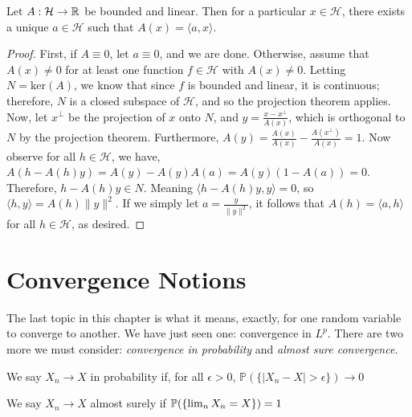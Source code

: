     \begin{theorem}
        Let $A : \mathcal H \to \mathbb R$ be bounded and linear. Then for a particular 
        $x \in \mathcal H$, there exists a unique $a \in \mathcal H$ such that $A(x) = \langle a, x \rangle$. 
    \end{theorem}
    \begin{proof}
        First, if $A \equiv 0$, let $a \equiv 0$, and we are done. Otherwise, assume that 
        $A(x) \neq 0$ for at least one function $f \in \mathcal H$ with $A(x) \neq 0$. Letting 
        $N = \text{ker}(A)$, we know that since $f$ is bounded and linear, it is continuous; therefore, 
        $N$ is a closed subspace of $\mathcal H$, and so the projection theorem applies. Now, let 
        $x^\perp$ be the projection of $x$ onto $N$, and 
        $y = \frac{x-x^\perp}{A(x)}$, which is orthogonal to $N$ by the projection theorem.
        Furthermore, $A(y) = \frac{A(x)}{A(x)} - \frac{A(x^\perp)}{A(x)} = 1$.
        Now observe for all $h \in \mathcal H$, we have, $A(h - A(h)y) = A(y) - A(y)A(a) = A(y)(1 - A(a)) = 0$.
        Therefore, $h-A(h)y \in N$. Meaning $\langle h - A(h) y, y \rangle = 0$, so $\langle h,y \rangle = A(h) \|y\|^2$. If we simply 
        let $a = \frac{y}{\|y\|^2}$, it follows that $A(h) = \langle a,h \rangle$ for all $h \in \mathcal H$, 
        as desired. 

    \end{proof} 

    \section{Convergence Notions}

    The last topic in this chapter is what it means, exactly, for one random variable 
    to converge to another. We have just seen one: convergence in $L^p$. There are two 
    more we must consider: \emph{convergence in probability} and \emph{almost sure convergence}. 

    \begin{definition}
        We say $X_n \to X$ in probability if, for all $\epsilon > 0$, $\mathbb P(\{|X_n - X| > \epsilon\}) \to 0$
    \end{definition}

    \begin{definition}
        We say $X_n \to X$ almost surely if $\mathbb P(\{\lim_n X_n = X\}) = 1$
    \end{definition}


